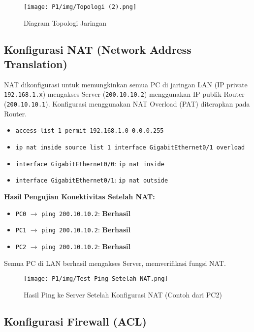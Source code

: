  \begin{figure}[H]
     \centering
    \texttt{[image: P1/img/Topologi (2).png]} %
    \caption{Diagram Topologi Jaringan}
     \label{fig:topologi}
 \end{figure}

\subsection*{Konfigurasi NAT (Network Address Translation)}
NAT dikonfigurasi untuk memungkinkan semua PC di jaringan LAN (IP private \texttt{192.168.1.x}) mengakses Server (\texttt{200.10.10.2}) menggunakan IP publik Router (\texttt{200.10.10.1}). Konfigurasi menggunakan NAT Overload (PAT) diterapkan pada Router.

\begin{itemize}
    \item \texttt{access-list 1 permit 192.168.1.0 0.0.0.255}
    \item \texttt{ip nat inside source list 1 interface GigabitEthernet0/1 overload}
    \item \texttt{interface GigabitEthernet0/0}: \texttt{ip nat inside}
    \item \texttt{interface GigabitEthernet0/1}: \texttt{ip nat outside}
\end{itemize}

\textbf{Hasil Pengujian Konektivitas Setelah NAT:}
\begin{itemize}
    \item \texttt{PC0} $\rightarrow$ \texttt{ping 200.10.10.2}: \textbf{Berhasil}
    \item \texttt{PC1} $\rightarrow$ \texttt{ping 200.10.10.2}: \textbf{Berhasil}
    \item \texttt{PC2} $\rightarrow$ \texttt{ping 200.10.10.2}: \textbf{Berhasil}
\end{itemize}
Semua PC di LAN berhasil mengakses Server, memverifikasi fungsi NAT.

\begin{figure}[H]
    \centering
    \texttt{[image: P1/img/Test Ping Setelah NAT.png]} %
    \caption{Hasil Ping ke Server Setelah Konfigurasi NAT (Contoh dari PC2)}
    \label{fig:ping_after_nat}
\end{figure}

\subsection*{Konfigurasi Firewall (ACL)}

